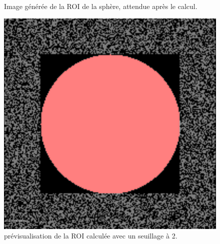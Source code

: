\documentclass{article}
\begin{document}
{{{{\begin{figure}[!p]
\begin{minipage}[t]{0.45\textwidth}
                        \caption{Image générée de la ROI de la sphère, attendue après le calcul.}
                        \label{fig:test-roi-selection-roi}
                    \end{minipage}

                    \bigskip\bigskip\bigskip

                    \begin{minipage}[t]{0.45\textwidth}
                        \centering
                        \includegraphics[width=\textwidth]{images/test-roi-selection-preview-2.png}
                        \caption{prévisualisation de la ROI calculée avec un seuillage à 2.}
                        \label{fig:test-roi-selection-preview-2}
                    \end{minipage}
                    \hfill
                    \begin{minipage}[t]{0.45\textwidth}
                        \centering

\end{minipage}
\end{figure}}}}}
\end{document}
